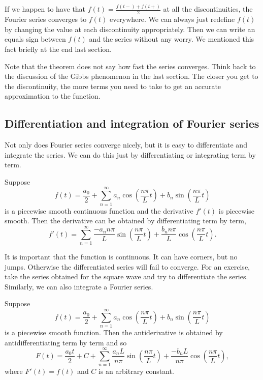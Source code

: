 If we happen to have that
$f(t) = \frac{f(t-)+f(t+)}{2}$ at all the discontinuities, the Fourier series
converges to $f(t)$ everywhere.  We can always just redefine $f(t)$
by changing the value at each discontinuity appropriately.  Then we can write
an equals sign between $f(t)$ and the series without any worry.
We mentioned this fact
briefly at the end last section.

Note that the theorem does not say how fast the series converges.
Think back to the discussion of the Gibbs phenomenon in the last section.
The closer you get to the discontinuity, the more terms you need to take
to get an accurate approximation to the function.

\subsection{Differentiation and integration of Fourier series}

Not only does Fourier series converge nicely, but it is easy to differentiate
and integrate the series.  We can do this just by differentiating or
integrating term by term.

\begin{theorem}
Suppose
\begin{equation*}
f(t) = \frac{a_0}{2} + \sum_{n=1}^\infty a_n \cos \left( \frac{n \pi}{L} t
\right)
+ b_n \sin \left( \frac{n \pi}{L} t \right)
\end{equation*}
is a piecewise smooth continuous function and the derivative $f'(t)$ is
piecewise smooth.  Then the derivative can be
obtained by differentiating term by term,
\begin{equation*}
f'(t) = \sum_{n=1}^\infty \frac{-a_n n \pi}{L} 
\sin \left( \frac{n \pi}{L} t \right)
+ \frac{b_n n \pi}{L} \cos \left( \frac{n \pi}{L} t \right) .
\end{equation*}
\end{theorem}

It is important that the function is continuous.  It can have corners, but no
jumps.  Otherwise the differentiated series will fail to converge.  For an
exercise, take the series obtained for the square wave and try to
differentiate the series.  Similarly, we can also integrate a Fourier series.

\begin{theorem}
Suppose
\begin{equation*}
f(t) = \frac{a_0}{2} + \sum_{n=1}^\infty
a_n \cos \left( \frac{n \pi}{L} t \right)
+ b_n \sin \left( \frac{n \pi}{L} t \right)
\end{equation*}
is a piecewise smooth function.  Then the antiderivative is
obtained by antidifferentiating term by term and so
\begin{equation*}
F(t) = \frac{a_0 t}{2} + C + \sum_{n=1}^\infty
\frac{a_n L}{n \pi} \sin \left( \frac{n \pi}{L} t \right)
+ \frac{-b_n L}{n \pi}  \cos \left( \frac{n \pi}{L} t \right) ,
\end{equation*}
where $F'(t) = f(t)$ and $C$ is an arbitrary constant.
\end{theorem}

